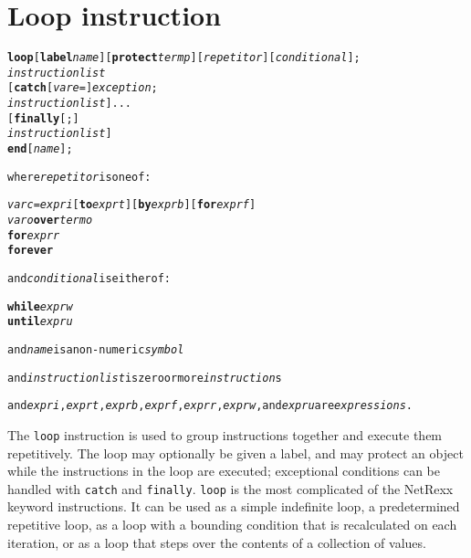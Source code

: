 \chapter{Loop instruction}\label{"id"}
\index{,}
\index{,}
\index{,}
\index{,}
\begin{shaded}
\begin{alltt}
\textbf{loop} [\textbf{label} \emph{name}] [\textbf{protect} \emph{termp}] [\emph{repetitor}] [\emph{conditional}];
        \emph{instructionlist}
    [\textbf{catch} [\emph{vare} =] \emph{exception};
        \emph{instructionlist}]...
    [\textbf{finally}[;]
        \emph{instructionlist}]
    \textbf{end} [\emph{name}];

where \emph{repetitor} is one of:

    \emph{varc} = \emph{expri} [\textbf{to} \emph{exprt}] [\textbf{by} \emph{exprb}] [\textbf{for} \emph{exprf}]
    \emph{varo} \textbf{over} \emph{termo}
    \textbf{for} \emph{exprr}
    \textbf{forever}

and \emph{conditional} is either of:

    \textbf{while} \emph{exprw}
    \textbf{until} \emph{expru}

and \emph{name} is a non-numeric \emph{symbol}

and \emph{instructionlist} is zero or more \emph{instruction}s

and \emph{expri}, \emph{exprt}, \emph{exprb}, \emph{exprf}, \emph{exprr}, \emph{exprw}, and \emph{expru} are \emph{expressions}.
\end{alltt}
\end{shaded}
 The \texttt{loop} instruction is used to group instructions together
and execute them repetitively.
The loop may optionally be given a label, and may protect an object
while the instructions in the loop are executed; exceptional conditions
can be handled with \texttt{catch} and \texttt{finally}.
 \texttt{loop} is the most complicated of the NetRexx keyword
instructions.
It can be used as a simple indefinite loop, a predetermined
repetitive loop, as a loop with a bounding condition that is
recalculated on each iteration, or as a loop that steps over the
contents of a collection of values.
